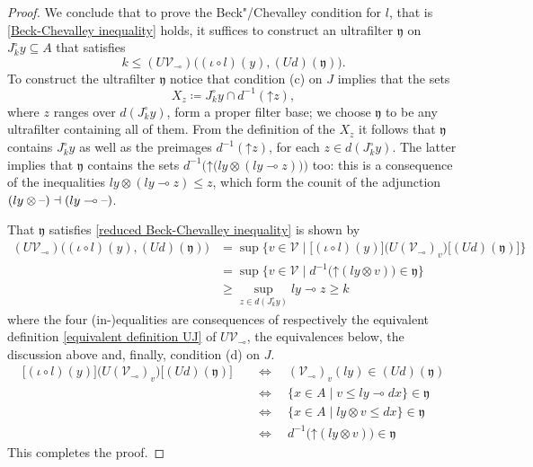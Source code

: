 \documentclass[preprint, a4paper]{elsarticle}
\newcommand{\dashcirc}{\multimap}
\theoremstyle{definition}
\theoremstyle{remark}
\renewcommand{\iff}{\Leftrightarrow}
\providecommand{\dfn}{\coloneqq}
\providecommand{\of}{\circ}
\newcommand{\dash}{\textup{--}}
\providecommand{\tens}{\otimes}
\providecommand{\mf}[1]{\mathfrak{#1}}
\providecommand{\brcs}[1]{\lbrace #1 \rbrace}
\providecommand{\bigbrcs}[1]{\bigl\lbrace #1 \bigr\rbrace}
\providecommand{\bigbrks}[1]{\bigl\lbrack #1 \bigr\rbrack}
\providecommand{\bigpars}[1]{\bigl(#1\bigr)}
\providecommand{\set}[1]{\brcs{#1}}
\providecommand{\isect}{\cap}
\providecommand{\upset}{\mathord\uparrow}
\providecommand{\rev}[1]{#1^\circ}
\providecommand{\inv}[1]{{#1}^{-1}}
\providecommand{\ladj}{\dashv}
\providecommand{\catvar}[1]{\mathcal{#1}}
\providecommand{\2}{\mathsf 2}
\providecommand{\V}{\catvar V}
\begin{document}
\begin{proof}
		We conclude that to prove the Beck"/Chevalley condition for $l$, that is \eqref{Beck-Chevalley inequality} holds, it suffices to construct an ultrafilter $\mf y$ on $\rev J_k y \subseteq A$ that satisfies
		\begin{equation} \label{reduced Beck-Chevalley inequality}
			k \leq (U\V_{\dashcirc})\bigpars{(\iota \of l)(y), (Ud)(\mf y)}.
		\end{equation}
		To construct the ultrafilter $\mf y$ notice that condition (c) on $J$ implies that the sets
		\begin{displaymath}
			X_z \dfn \rev J_k y \isect \inv d(\upset z),
		\end{displaymath}
		where $z$ ranges over $d(\rev J_ky)$, form a proper filter base; we choose $\mf y$ to be any ultrafilter containing all of them. From the definition of the $X_z$ it follows that $\mf y$ contains $\rev J_k y$ as well as the preimages $\inv d(\upset z)$, for each $z \in d(\rev J_ky)$. The latter implies that $\mf y$ contains the sets $\inv d\bigpars{\upset\bigpars{ly \tens (ly \dashcirc z)}}$ too: this is a consequence of the inequalities $ly \tens (ly \dashcirc z) \leq z$, which form the counit of the adjunction $(ly \tens \dash) \ladj (ly \dashcirc \dash)$.
		
		That $\mf y$ satisfies \eqref{reduced Beck-Chevalley inequality} is shown by
		\begin{align*}
			(U\V_{\dashcirc})\bigpars{(\iota \of l)(y), (Ud)(\mf y)} &= \sup\bigbrcs{v \in \V \mid \bigbrks{(\iota \of l)(y)} \bigpars{U(\V_\dashcirc)_v} \bigbrks{(Ud)(\mf y)}} \\
			&= \sup\bigbrcs{v \in \V \mid \inv d\bigpars{\upset(ly \tens v)} \in \mf y} \\
			&\geq \sup_{z \in d(\rev J_ky)} ly \dashcirc z \geq k
		\end{align*}
		where the four (in-)equalities are consequences of respectively the equivalent definition \eqref{equivalent definition UJ} of $U\V_{\dashcirc}$, the equivalences below, the discussion above and, finally, condition (d) on $J$. 
		\begin{align*}
			\bigbrks{(\iota \of l)(y)} \bigpars{U(\V_\dashcirc)_v} \bigbrks{(Ud)(\mf y)} \quad &\iff \quad (\V_\dashcirc)_v(ly) \in (Ud)(\mf y) \\
			&\iff \quad \set{x \in A \mid v \leq ly \dashcirc dx} \in \mf y \\
			&\iff \quad \set{x \in A \mid ly \tens v \leq dx} \in \mf y \\
			&\iff \quad \inv d\bigpars{\upset(ly \tens v)} \in \mf y
		\end{align*}
		This completes the proof.
	\end{proof}
	
\end{document}
